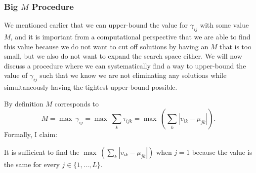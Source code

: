 \documentclass[../thesis.tex]{subfiles}
\begin{document}
\subsubsection{Big $M$ Procedure}
We mentioned earlier that we can upper-bound the value for $\gamma_{ij}$ with
some value $M$, and it is important from a computational perspective that we are
able to find this value because we do not want to cut off solutions by having an
$M$ that is too small, but we also do not want to expand the search space
either. We will now discuss a procedure where we can systematically find a way
to upper-bound the value of $\gamma_{ij}$ such that we know we are not
eliminating any solutions while simultaneously having the tightest upper-bound
possible.

By definition $M$ corresponds to
\begin{equation*}
    M = \max \ \gamma_{ij} = \max \ \sum_k \tau_{ijk} = \max \
    \left(\sum_k |v_{ik} - \mu_{jk}|\right).
\end{equation*}
Formally, I claim:

\begin{theorem}
    It is sufficient to find the $\max \ \left(\sum_k |v_{ik} -
    \mu_{jk}|\right)$ when $j = 1$ because the value is the same for every $j
    \in \{1, \ldots, L\}$.
\end{theorem}
\end{document}
